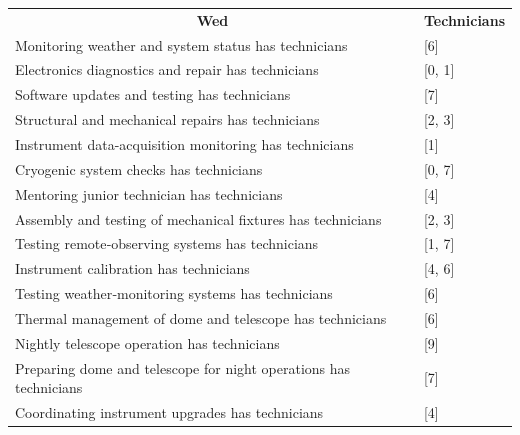\documentclass{article}
\begin{document}
\begin{table}[!ht]
\begin{tabular}{ll}
\multicolumn{1}{c}{\textbf{Wed}}                                  & \multicolumn{1}{c}{\textbf{Technicians}} \\
Monitoring weather and system status has technicians              & {[}6{]}                                  \\
Electronics diagnostics and repair has technicians                & {[}0, 1{]}                               \\
Software updates and testing has technicians                      & {[}7{]}                                  \\
Structural and mechanical repairs has technicians                 & {[}2, 3{]}                               \\
Instrument data-acquisition monitoring has technicians            & {[}1{]}                                  \\
Cryogenic system checks has technicians                           & {[}0, 7{]}                               \\
Mentoring junior technician has technicians                            & {[}4{]}                                  \\
Assembly and testing of mechanical fixtures has technicians       & {[}2, 3{]}                               \\
Testing remote‑observing systems has technicians                  & {[}1, 7{]}                               \\
Instrument calibration has technicians                            & {[}4, 6{]}                               \\
Testing weather‑monitoring systems has technicians                & {[}6{]}                                  \\
Thermal management of dome and telescope has technicians          & {[}6{]}                                  \\
Nightly telescope operation has technicians                       & {[}9{]}                                  \\
Preparing dome and telescope for night operations has technicians & {[}7{]}                                  \\
Coordinating instrument upgrades has technicians                  & {[}4{]}                                  \\                               
\end{tabular}
\end{table}
\end{document}
